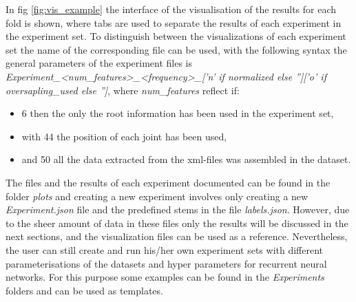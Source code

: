 	In fig \ref{fig:vis_example} the interface of the visualisation of the results for each fold is shown, where tabs are used to separate the results of each experiment in the experiment set. To distinguish between the visualizations of each experiment set the name of the corresponding file can be used, with the following syntax the general parameters of the experiment files is \textit{Experiment\_<num\_features>\_<frequency>\_['n' if normalized else '']['o' if oversapling\_used else '']}, where \textit{num\_features} reflect if:
	\begin{itemize}
		\item 6 then the only the root information has been used in the experiment set,
		\item with 44 the position of each joint has been used, 
		\item and 50 all the data extracted from the xml-files was assembled in the dataset.
	\end{itemize}
	The files and the results of each experiment documented can be found in the folder \textit{plots} and creating a new experiment involves only creating a new \textit{Experiment.json} file and the predefined stems in the file \textit{labels.json}. However, due to the sheer amount of data in these files only the results will be discussed in the next sections, and the visualization files can be used as a reference. Nevertheless, the user can still create and run his/her own experiment sets with different parameterisations of the datasets and hyper parameters for recurrent neural networks. For this purpose some examples can be found in the \textit{Experiments} folders and can be used as templates.
